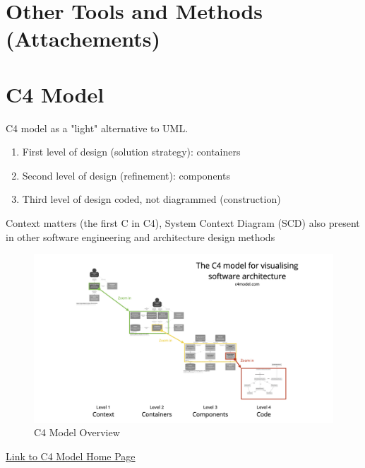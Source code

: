 \documentclass[../Main.tex]{subfiles}
\begin{document}
\section{Other Tools and Methods (Attachements)}
\section{C4 Model}
C4 model as a "light" alternative to UML. 
\begin{enumerate}
    \item First level of design (solution strategy): containers
    \item Second level of design (refinement): components
    \item Third level of design coded, not diagrammed (construction)
\end{enumerate}

Context matters (the first C in C4), System Context Diagram (SCD) also present in other software engineering and architecture design methods

\begin{figure}[H]
    \centering
    \includegraphics[]{Images/c4-overview.png}
    \caption{C4 Model Overview}
\end{figure}
\href{https://c4model.com/}{Link to C4 Model Home Page}

\newpage
\end{document}
